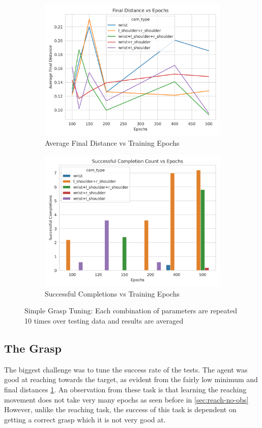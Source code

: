 \begin{figure}[htpb] %
  \centering
  \begin{subfigure}{0.45\linewidth}
    \centering
    \includegraphics[width=0.7\linewidth]{assets/cam-comb/grasp-simple/tuning-normal-old-policy-dist.png}
    \caption{Average Final Distance vs Training Epochs}\label{subfig:grasp-tuning-dist}
  \end{subfigure}
  \begin{subfigure}{0.45\linewidth}
    \centering
    \includegraphics[width=0.7\linewidth]{assets/cam-comb/grasp-simple/tuning-normal-old-policy-success.png}
    \caption{Successful Completions vs Training Epochs}\label{subfig:grasp-tuning-dist-success}
  \end{subfigure}
  \caption{Simple Grasp Tuning: Each combination of parameters are repeated 10 times over testing data and results are averaged}\label{fig:grasp-tuning-epochs}
\end{figure}

\subsection{The Grasp}
The biggest challenge was to tune the success rate of the tests. The agent was good at reaching towards the target, as evident from the fairly low minimum and final distances \ref{subfig:grasp-tuning-dist}. An observation from these task is that learning the reaching movement does not take very many epochs as seen before in \ref{sec:reach-no-obs} However, unlike the reaching task, the success of this task is dependent on getting a correct grasp which it is not very good at.

